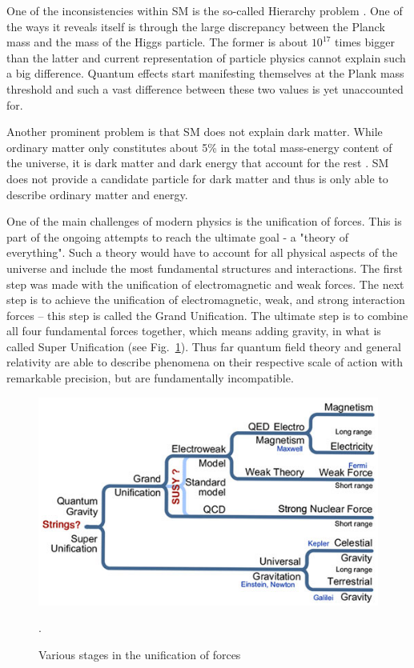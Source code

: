 One of the inconsistencies within SM is the so-called Hierarchy problem \citep{PhysRevD.14.1667}. One of the ways it reveals itself is through the large discrepancy between the Planck mass and the mass of the Higgs particle. The former is about $10^{17}$ times bigger than the latter and current representation of particle physics cannot explain such a big difference. Quantum effects start manifesting themselves at the Plank mass threshold and such a vast difference between these two values is yet unaccounted for. 

Another prominent problem is that SM does not explain dark matter. While ordinary matter only constitutes about 5\% in the total mass-energy content of the universe, it is dark matter and dark energy that account for the rest \citep{ade2014planck}. 
SM does not provide a candidate particle for dark matter and thus is only able to describe ordinary matter and energy. 

One of the main challenges of modern physics is the unification of forces. This is part of the ongoing attempts to reach the ultimate goal - a "theory of everything". Such a theory would have to account for all physical aspects of the universe and include the most fundamental structures and interactions. The first step was made with the unification of electromagnetic and weak forces.  
The next step is to achieve the unification of electromagnetic, weak, and strong interaction forces – this step is called the Grand Unification. The ultimate step is to combine all four fundamental forces together, which means adding gravity, in what is called Super Unification (see Fig.~\ref{fig:unification}). Thus far quantum field theory and general relativity are able to describe phenomena on their respective scale of action with remarkable precision, but are fundamentally incompatible.  
\begin{figure}[ht]
		\centering
			\includegraphics[scale=0.8]{Chap2/Unification}
\caption[Unification of forces]{\label{fig:unification} Various stages in the unification of forces  \citep{unification}}.
\end{figure}

